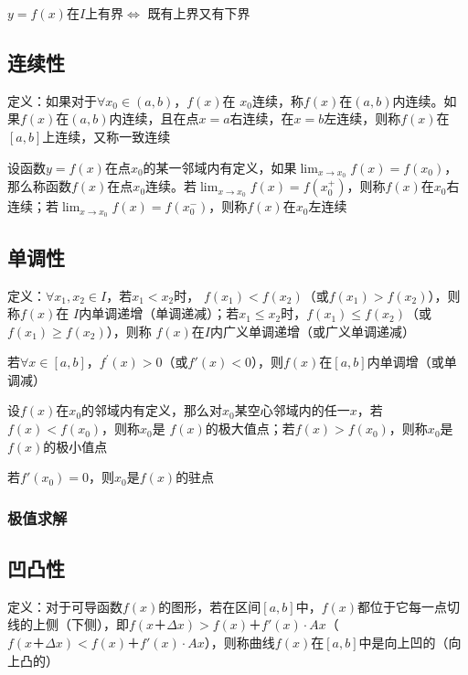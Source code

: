 \documentclass[12pt]{book}
\begin{document}
$y=f(x)$在$I$上有界$\Leftrightarrow$ 既有上界又有下界

\subsection{连续性}

定义：如果对于$\forall x_0\in (a,b)$，$f(x)$在 $x_0$连续，称$f(x)$在$(a,b)$内连续。如果$f(x)$在$(a,b)$内连续，且在点$x=a$右连续，在$x=b$左连续，则称$f(x)$在$[a,b]$上连续，又称一致连续

设函数$y=f(x)$在点$x_0$的某一邻域内有定义，如果$\lim_{x\rightarrow x_0}{f(x)}= f(x_0)$，那么称函数$f(x)$在点$x_0$连续。若$\lim_{x\rightarrow x_0}{f(x)}= f(x_0^+)$，则称$f(x)$在$x_0$右连续；若$\lim_{x\rightarrow x_0}{f(x)}= f(x_0^-)$，则称$f(x)$在$x_0$左连续

\subsection{单调性}

定义：$\forall x_1, x_2\in I$，若$x_1<x_2$时， $f(x_1)<f(x_2)$（或$f(x_1)>f(x_2)$），则称$f(x)$在 $I$内单调递增（单调递减）；若$x_1\leq x_2$时，$f(x_1)\leq f(x_2)$（或$f(x_1)\geq f(x_2)$），则称 $f(x)$在$I$内广义单调递增（或广义单调递减）

若$\forall x\in[a,b]$，$f^\prime(x)>0$（或$f'(x)<0$），则$f(x)$在$[a,b]$内单调增（或单调减）

设$ f(x)$在$x_0$的邻域内有定义，那么对$x_0$某空心邻域内的任一$x$，若$f(x)< f(x_0)$，则称$x_0$是 $f(x)$的极大值点；若$f(x)> f(x_0)$，则称$x_0$是 $f(x)$的极小值点

若$f'(x_0)=0$，则$x_0$是$f(x)$的驻点



\subsubsection{极值求解}













\subsection{凹凸性}

定义：对于可导函数$f(x)$的图形，若在区间$[a,b]$中，$f(x)$都位于它每一点切线的上侧（下侧），即$ f(x＋\Delta x)>f(x)＋f'(x)\cdot A x$（$ f(x＋\Delta x)<f(x)＋f'(x)\cdot A x$），则称曲线$f(x)$在$[a,b]$中是向上凹的（向上凸的）
\end{document}
